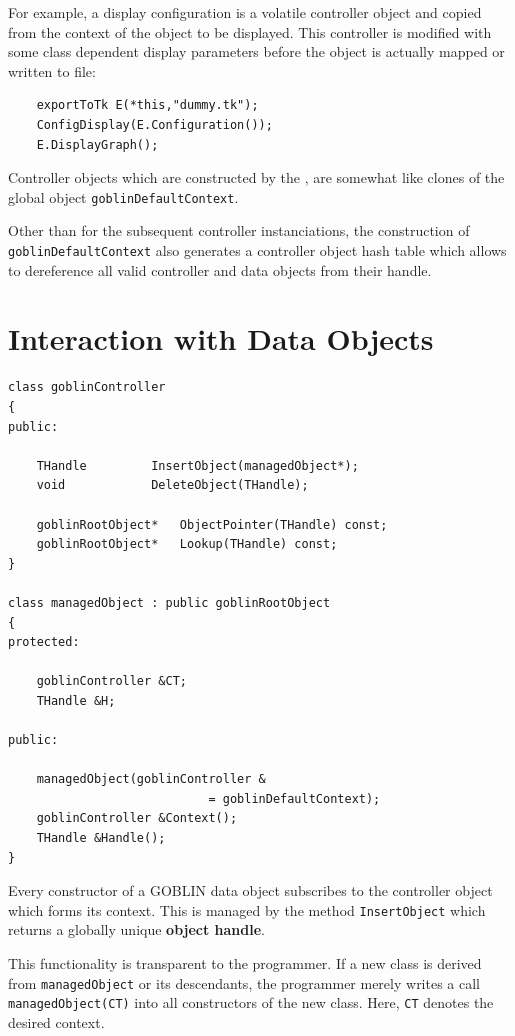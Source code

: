 \documentclass[a4paper,11pt,twoside]{book}
\begin{document}
\begin{multicols}{2}
For example, a display configuration is a volatile controller object and copied
from the context of the object to be displayed. This controller is modified
with some class dependent display parameters before the object is actually
mapped or written to file: 
\begin{verbatim}
    exportToTk E(*this,"dummy.tk");
    ConfigDisplay(E.Configuration());
    E.DisplayGraph();
\end{verbatim}
Controller objects which are constructed by the , are
somewhat like clones of the global object \verb/goblinDefaultContext/.

Other than for the subsequent controller instanciations, the construction of
\verb/goblinDefaultContext/ also generates a controller object hash table which
allows to dereference all valid controller and data objects from their handle.



\section{Interaction with Data Objects}
\begin{mymethods}
\begin{verbatim}
class goblinController
{
public:

    THandle         InsertObject(managedObject*);
    void            DeleteObject(THandle);

    goblinRootObject*   ObjectPointer(THandle) const;
    goblinRootObject*   Lookup(THandle) const;
}

class managedObject : public goblinRootObject
{
protected:

    goblinController &CT;
    THandle &H;

public:

    managedObject(goblinController &
                            = goblinDefaultContext);
    goblinController &Context();
    THandle &Handle();
}
\end{verbatim}
\end{mymethods}
Every constructor of a GOBLIN data object subscribes to the controller object
which forms its context. This is managed by the method \verb/InsertObject/
which returns a globally unique {\bf object handle}.

This functionality is transparent to the programmer. If a new class is derived
from \verb/managedObject/ or its descendants, the programmer merely writes
a call \verb/managedObject(CT)/ into all constructors of the new class.
Here, \verb/CT/ denotes the desired context.


\end{multicols}
\end{document}
